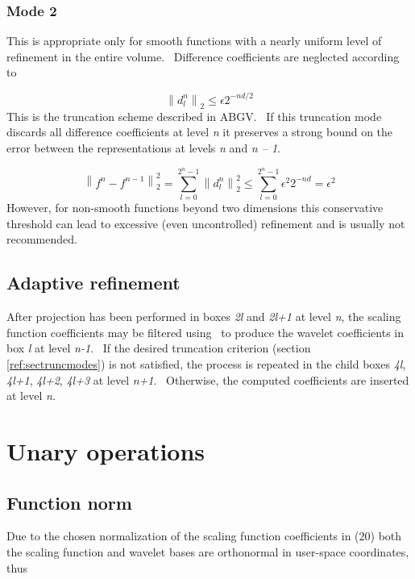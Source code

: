 \documentclass[letterpaper]{book}
\begin{document}
\subsubsection{Mode 2}
This is appropriate only for smooth functions with a nearly uniform level of refinement in the entire volume.
\ Difference coefficients are neglected according to 

\begin{equation}
\left\|d_{l}^{n}\right\|_{2}\le \epsilon 2^{-nd/2}
\end{equation}
This is the truncation scheme described in ABGV. \ If this truncation mode discards all difference coefficients at level
\textit{n} it preserves a strong bound on the error between the representations at levels \textit{n} and \textit{n --
1}. 

\begin{equation}
\left\|f^{n}-f^{n-1}\right\|_{2}^{2}=\sum _{l=0}^{2^{n}-1}\left\|d_{l}^{n}\right\|_{2}^{2}\le \sum
_{l=0}^{2^{n}-1}\epsilon ^{2}2^{-nd}=\epsilon ^{2}
\end{equation}
However, for non-smooth functions beyond two dimensions this conservative threshold can lead to excessive (even
uncontrolled) refinement and is usually not recommended.

\subsection{Adaptive refinement}
After projection has been performed in boxes \textit{2l} and \textit{2l+1} at level \textit{n}, the scaling function
coefficients may be filtered using \ to produce the wavelet coefficients in box \textit{l} at level \textit{n-1}. \ If
the desired truncation criterion (section \ref{ref:sectruncmodes}) is not satisfied, the process is repeated in the
child boxes \textit{4l}, \textit{4l+1}, \textit{4l+2}, \textit{4l+3} at level \textit{n+1}. \ Otherwise, the computed
coefficients are inserted at level \textit{n}.

\section[Unary operations]{\rmfamily Unary operations}
\subsection[Function norm]{\rmfamily Function norm}
Due to the chosen normalization of the scaling function coefficients in (20) both the scaling function and wavelet bases
are orthonormal in user-space coordinates, thus 
\end{document}
